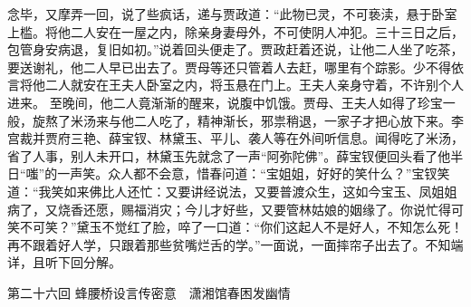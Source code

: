 \documentclass[12pt,oneside]{book}
\begin{document}
念毕，又摩弄一回，说了些疯话，递与贾政道：“此物已灵，不可亵渎，悬于卧室上槛。将他二人安在一屋之内，除亲身妻母外，不可使阴人冲犯。三十三日之后，包管身安病退，复旧如初。”说着回头便走了。贾政赶着还说，让他二人坐了吃茶，要送谢礼，他二人早已出去了。贾母等还只管着人去赶，哪里有个踪影。少不得依言将他二人就安在王夫人卧室之内，将玉悬在门上。王夫人亲身守着，不许别个人进来。
至晚间，他二人竟渐渐的醒来，说腹中饥饿。贾母、王夫人如得了珍宝一般，旋熬了米汤来与他二人吃了，精神渐长，邪祟稍退，一家子才把心放下来。李宫裁并贾府三艳、薛宝钗、林黛玉、平儿、袭人等在外间听信息。闻得吃了米汤，省了人事，别人未开口，林黛玉先就念了一声“阿弥陀佛”。薛宝钗便回头看了他半日“嗤”的一声笑。众人都不会意，惜春问道：“宝姐姐，好好的笑什么？”宝钗笑道：“我笑如来佛比人还忙：又要讲经说法，又要普渡众生，这如今宝玉、凤姐姐病了，又烧香还愿，赐福消灾；今儿才好些，又要管林姑娘的姻缘了。你说忙得可笑不可笑？”黛玉不觉红了脸，啐了一口道：“你们这起人不是好人，不知怎么死！再不跟着好人学，只跟着那些贫嘴烂舌的学。”一面说，一面摔帘子出去了。不知端详，且听下回分解。
 
第二十六回  蜂腰桥设言传密意　潇湘馆春困发幽情
\end{document}
